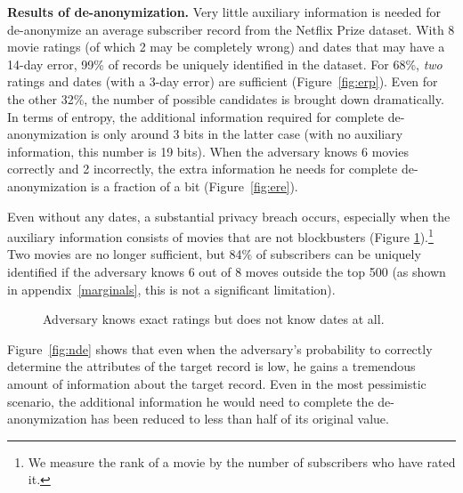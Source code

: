 \documentclass[11pt]{article}
\begin{document}
\vspace{1ex}
\noindent
\textbf{Results of de-anonymization.}
Very little auxiliary information is needed for de-anonymize an
average subscriber record from the Netflix Prize dataset.  With 8 movie
ratings (of which 2 may be completely wrong) and dates that may have
a 14-day error, 99\% of records be uniquely identified in the dataset.
For 68\%, \emph{two} ratings and dates (with a 3-day error) are sufficient
(Figure~\ref{fig:erp}).  Even for the other 32\%, the number of possible
candidates is brought down dramatically.  In terms of entropy, the
additional information required for complete de-anonymization is only
around 3 bits in the latter case (with no auxiliary information, this
number is 19 bits).  When the adversary knows 6 movies correctly and 2
incorrectly, the extra information he needs for complete de-anonymization
is a fraction of a bit (Figure~\ref{fig:ere}).

Even without any dates, a substantial privacy breach occurs,
especially when the auxiliary information consists of movies that are
not blockbusters (Figure \ref{fig:ndp}).\footnote{We measure the rank of
a movie by the number of subscribers who have rated it.}  Two movies are
no longer sufficient, but 84\% of subscribers can be uniquely identified
if the adversary knows 6 out of 8 moves outside the top 500 (as shown
in appendix~\ref{marginals}, this is not a significant limitation).

\begin{figure}
\begin{minipage}[b]{0.47\linewidth} %
\centering
\mbox{}
\caption{Entropic de-anonymization: 
same parameters as in Figure~\ref{fig:erp}.\label{fig:ere}}
\end{minipage}
\hspace{.5cm} %
\begin{minipage}[b]{0.47\linewidth}
\centering
\mbox{}
\caption{Adversary knows exact ratings but does not know dates at
all.\label{fig:ndp}}
\end{minipage}
\end{figure}

Figure~\ref{fig:nde} shows that even when the adversary's probability
to correctly determine the attributes of the target record is low,
he gains a tremendous amount of information about the target record.
Even in the most pessimistic scenario, the additional information he
would need to complete the de-anonymization has been reduced to less
than half of its original value.
\end{document}
